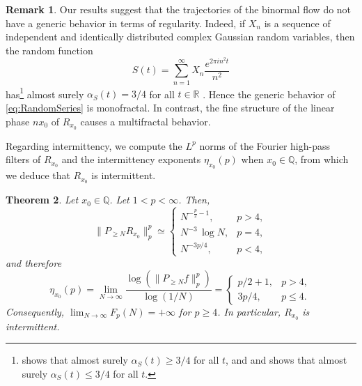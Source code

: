 \documentclass[11pt,reqno]{amsart}
\newtheorem{thm}{Theorem}[section]
\theoremstyle{definition}
\newtheorem{rem}[thm]{Remark}
\begin{document}
\begin{rem}
Our results suggest that the trajectories of the binormal flow do not have a generic behavior in terms of regularity. 
Indeed, if $X_n$ is a sequence of independent and identically distributed complex Gaussian random variables,
then the random function
\begin{equation}\label{eq:RandomSeries}
S(t) = \sum_{n=1}^\infty X_n \frac{e^{2\pi i n^2 t}}{n^2}
\end{equation}
has\footnote{
\cite[p.86, Theorem 2]{Kahane1985}  shows that almost surely $\alpha_S(t) \geq 3/4$ for all $t$, and
and \cite[p.104, Theorem 5]{Kahane1985} shows that almost surely $\alpha_S(t) \leq 3/4$ for all $t$. 
}  almost surely $\alpha_S(t) = 3/4$ for all $t \in \mathbb R$ \cite{Kahane1985}. 
Hence the generic behavior of \eqref{eq:RandomSeries} is monofractal. 
In contrast, the fine structure of the linear phase $nx_0$ of $R_{x_0}$ causes a multifractal behavior.  
\end{rem}


Regarding intermittency, we compute the $L^p$ norms of the Fourier high-pass filters of $R_{x_0}$
and the intermittency exponents $\eta_{x_0}(p)$ 
when $x_0 \in \mathbb Q$,
 from which we deduce that $R_{x_0}$ is intermittent. 
\begin{thm}\label{thm:Main_Theorem_Rationals_Intermittency}
Let $x_0 \in \mathbb Q$. Let $1 < p < \infty$. Then, 
\begin{equation}\label{eq:Main_Theorem_Rationals_Lp}
\big\lVert  P_{\geq N} R_{x_0} \big\rVert_p^p \simeq 
\left\{  \begin{array}{ll}
N^{-\frac{p}{2} - 1}, & p > 4, \\
N^{-3} \, \log N, & p = 4, \\
N^{-3p/4}, & p < 4, 
\end{array}
\right.
\end{equation}
and therefore 
\begin{equation}
\eta_{x_0}(p)
= \lim_{N \to \infty} \frac{\log (\lVert  P_{\geq N} f \rVert_p^p ) }{\log (1/N)}
= \left\{ \begin{array}{ll}
p/2 + 1, & p > 4, \\
3p/4, & p \leq 4.
\end{array}
\right.
\end{equation}
Consequently, $\lim_{N \to \infty} F_p(N) = +\infty$ for $p \geq 4$. 
In particular, $R_{x_0}$ is intermittent. 
\end{thm}
\end{document}
